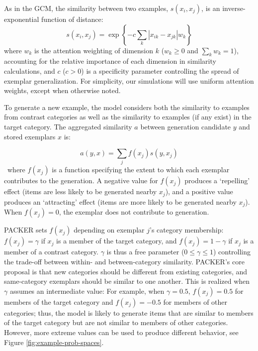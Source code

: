 \documentclass[10pt,letterpaper]{article}
\begin{document}
As in the GCM, the similarity between two examples, $s\left(x_i, x_j\right)$, is an inverse-exponential function of distance:
\begin{equation}
  s\left(x_i,x_j\right) = \exp \left\{ -c \sum_{k}{ \left| x_{ik} - x_{jk} \right|}w_k \right\}
  \label{eq:similarity}
\end{equation}
where $w_k$ is the attention weighting of dimension $k$ ($w_k \geq 0$ and $\sum_k{w_k} = 1$), accounting for the relative importance of each dimension in similarity calculations, and $c$ ($c>0$) is a specificity parameter controlling the spread of exemplar generalization. For simplicity, our simulations will use uniform attention weights, except when otherwise noted.  

To generate a new example, the model considers both the similarity to examples from contrast categories as well as the similarity to examples (if any exist) in the target category. The aggregated similarity $a$ between generation candidate $y$ and stored exemplars $x$ is:

\begin{equation}
  a(y, x) = \sum_j{f(x_j) s(y, x_j)}
  \label{eq:aggregation}
\end{equation}
\
where $f(x_j)$ is a function specifying the extent to which each exemplar contributes to the generation. A negative value for $f(x_j)$ produces a `repelling' effect (items are less likely to be generated nearby $x_j$), and a positive value produces an `attracting' effect (items are more likely to be generated nearby $x_j$). When $f(x_j)=0$, the exemplar does not contribute to generation. 

PACKER sets $f(x_j)$ depending on exemplar $j$'s category membership: $f(x_j) = \gamma$ if $x_j$ is a member of the target category, and $f(x_j) = 1 - \gamma$ if $x_j$ is a member of a contrast category. $\gamma$ is thus a free parameter ($0 \leq \gamma \leq 1$) controlling the trade-off between within- and between-category similarity. PACKER's core proposal is that new categories should be different from existing categories, and same-category exemplars should be similar to one another. This is realized when $\gamma$ assumes an intermediate value: For example, when $\gamma = 0.5$, $f(x_j) = 0.5$ for members of the target category and $f(x_j) = -0.5$ for members of other categories; thus, the model is likely to generate items that are similar to members of the target category but are not similar to members of other categories. However, more extreme values can be used to produce different behavior, see Figure \ref{fig:example-prob-spaces}.
\end{document}
